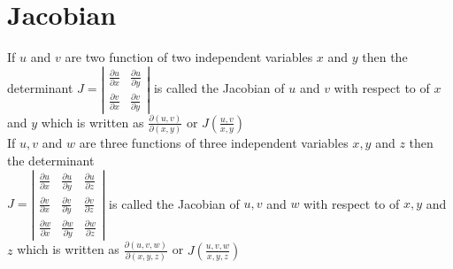 \section{Jacobian}
If $u$ and $v$ are two function of two independent variables $x$ and $y$ then the determinant $J=\left|\begin{array}{ll}\frac{\partial u}{\partial x} & \frac{\partial u}{\partial y} \\ \frac{\partial v}{\partial x} & \frac{\partial v}{\partial y}\end{array}\right|$ is called the Jacobian of $u$ and $v$ with respect to of $x$ and $y$ which is written as $\frac{\partial(u, v)}{\partial(x, y)}$ or $J\left(\frac{u, v}{x, y}\right)$\\
If $u, v$ and $w$ are three functions of three independent variables $x, y$ and $z$ then the determinant\\
$J=\left|\begin{array}{lll}\frac{\partial u}{\partial x} & \frac{\partial u}{\partial y} & \frac{\partial u}{\partial z} \\ \frac{\partial v}{\partial x} & \frac{\partial v}{\partial y} & \frac{\partial v}{\partial z} \\ \frac{\partial w}{\partial x} & \frac{\partial w}{\partial y} & \frac{\partial w}{\partial z}\end{array}\right|$
is called the Jacobian of $u, v$ and $w$ with respect to of $x, y$ and $z$
which is written as $\frac{\partial(u, v, w)}{\partial(x, y, z)}$ or $J\left(\frac{u, v, w}{x, y, z}\right)$
